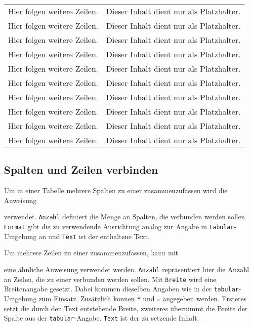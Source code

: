 \begin{block}
\begin{longtable}{@{}lp{}@{}}
		Hier folgen weitere Zeilen. & Dieser Inhalt dient nur als Platzhalter. \\
		Hier folgen weitere Zeilen. & Dieser Inhalt dient nur als Platzhalter. \\
		Hier folgen weitere Zeilen. & Dieser Inhalt dient nur als Platzhalter. \\
		Hier folgen weitere Zeilen. & Dieser Inhalt dient nur als Platzhalter. \\
		Hier folgen weitere Zeilen. & Dieser Inhalt dient nur als Platzhalter. \\
		Hier folgen weitere Zeilen. & Dieser Inhalt dient nur als Platzhalter. \\
		Hier folgen weitere Zeilen. & Dieser Inhalt dient nur als Platzhalter. \\
		Hier folgen weitere Zeilen. & Dieser Inhalt dient nur als Platzhalter. \\
		Hier folgen weitere Zeilen. & Dieser Inhalt dient nur als Platzhalter. \\
		Hier folgen weitere Zeilen. & Dieser Inhalt dient nur als Platzhalter. \\
    \bottomrule
\end{longtable}
\end{block}


\subsection{Spalten und Zeilen verbinden}

Um in einer Tabelle mehrere Spalten zu einer zusammenzufassen wird die Anweisung
%
\begin{GenericCode}[numbers=none]
\end{GenericCode}
%
verwendet. \texttt{Anzahl} definiert die Menge an Spalten, die verbunden
werden sollen. \texttt{Format} gibt die zu verwendende Ausrichtung analog zur
Angabe in \texttt{tabular}-Umgebung an und \texttt{Text} ist der enthaltene
Text.

Um mehrere Zeilen zu einer zusammenzufassen, kann mit
%
\begin{GenericCode}[numbers=none]
\end{GenericCode}
%
eine ähnliche Anweisung verwendet werden. \texttt{Anzahl} repräsentiert hier
die Anzahl an Zeilen, die zu einer verbunden werden sollen. Mit
\texttt{Breite} wird eine Breitenangabe gesetzt. Dabei kommen dieselben
Angaben wie in der \texttt{tabular}-Umgebung zum Einsatz. Zusätzlich können
\texttt{*} und \texttt{=} angegeben werden. Ersteres setzt die durch den Text
entstehende Breite, zweiteres übernimmt die Breite der Spalte aus der
\texttt{tabular}-Angabe. \texttt{Text} ist der zu setzende Inhalt.


